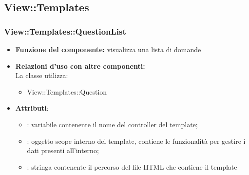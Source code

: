 \subsection{View::Templates}
\subsubsection{View::Templates::QuestionList}
\begin{itemize}
\item\textbf{Funzione del componente:} visualizza una lista di domande
				\item\textbf{Relazioni d'uso con altre componenti:} \\
La classe utilizza:
	\begin{itemize}
		\item View::Templates::Question
	\end{itemize}
\item\textbf{Attributi}:
\begin{itemize}
		\item{}: variabile contenente il nome del controller del template;\\
		\item{}: oggetto scope interno del template, contiene le funzionalità per gestire i dati presenti all’interno;\\
		\item{}: stringa contenente il percorso del file HTML che contiene il template\\
	\end{itemize}
\end{itemize}

